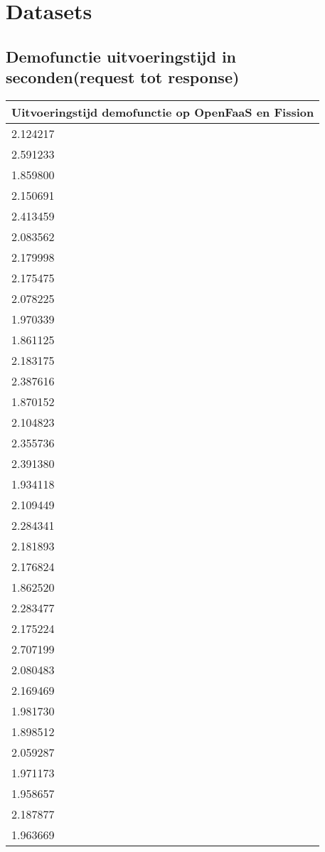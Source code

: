 \section{Datasets}
\subsection{Demofunctie uitvoeringstijd in seconden(request tot response)}
\label{sec:uitvoeringstijd-demofunctie}
\begin{longtable}[c]{l}
    \textbf{Uitvoeringstijd demofunctie op OpenFaaS en Fission} \\
    \endfirsthead
    \endhead
    2.124217 \\
    2.591233 \\
    1.859800 \\
    2.150691 \\
    2.413459 \\
    2.083562 \\
    2.179998 \\
    2.175475 \\
    2.078225 \\
    1.970339 \\
    1.861125 \\
    2.183175 \\
    2.387616 \\
    1.870152 \\
    2.104823 \\
    2.355736 \\
    2.391380 \\
    1.934118 \\
    2.109449 \\
    2.284341 \\
    2.181893 \\
    2.176824 \\
    1.862520 \\
    2.283477 \\
    2.175224 \\
    2.707199 \\
    2.080483 \\
    2.169469 \\
    1.981730 \\
    1.898512 \\
    2.059287 \\
    1.971173 \\
    1.958657 \\
    2.187877 \\
    1.963669 \\

\end{longtable}
